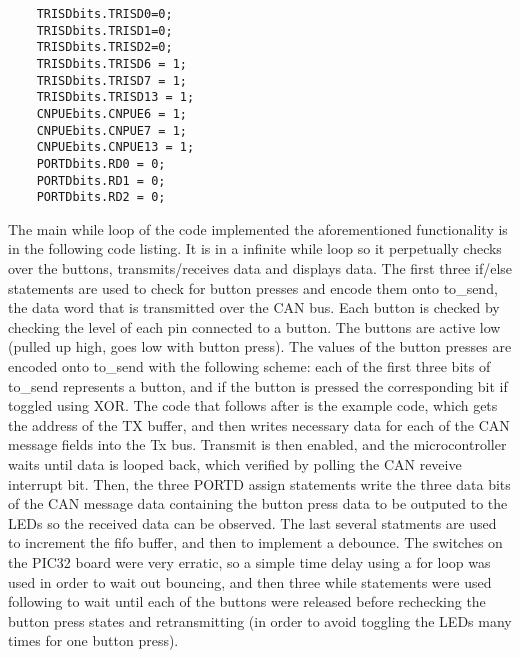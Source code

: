 \documentclass[12pt]{article}
\begin{document}
\begin{lstlisting}
    TRISDbits.TRISD0=0; 
    TRISDbits.TRISD1=0;
    TRISDbits.TRISD2=0;
    TRISDbits.TRISD6 = 1;
    TRISDbits.TRISD7 = 1;
    TRISDbits.TRISD13 = 1;    
    CNPUEbits.CNPUE6 = 1;
    CNPUEbits.CNPUE7 = 1;
    CNPUEbits.CNPUE13 = 1;
    PORTDbits.RD0 = 0; 
    PORTDbits.RD1 = 0; 
    PORTDbits.RD2 = 0; 
\end{lstlisting}
The main while loop of the code implemented the aforementioned functionality is in the following code listing. It is in a infinite while loop so it perpetually checks over the buttons, transmits/receives data and displays data. The first three if/else statements are used to check for button presses and encode them onto to{\_}send, the data word that is transmitted over the CAN bus. Each button is checked by checking the level of each pin connected to a button. The buttons are active low (pulled up high, goes low with button press). The values of the button presses are encoded onto to{\_}send with the following scheme: each of the first three bits of to{\_}send represents a button, and if the button is pressed the corresponding bit if toggled using XOR. The code that follows after is the example code, which gets the address of the TX buffer, and then writes necessary data for each of the CAN message fields into the Tx bus. Transmit is then enabled, and the microcontroller waits until data is looped back, which verified by polling the CAN reveive interrupt bit. Then, the three PORTD assign statements write the three data bits of the CAN message data containing the button press data to be outputed to the LEDs so the received data can be observed. The last several statments are used to increment the fifo buffer, and then to implement a debounce. The switches on the PIC32 board were very erratic, so a simple time delay using a for loop was used in order to wait out bouncing, and then three while statements were used following to wait until each of the buttons were released before rechecking the button press states and retransmitting (in order to avoid toggling the LEDs many times for one button press).
\end{document}
